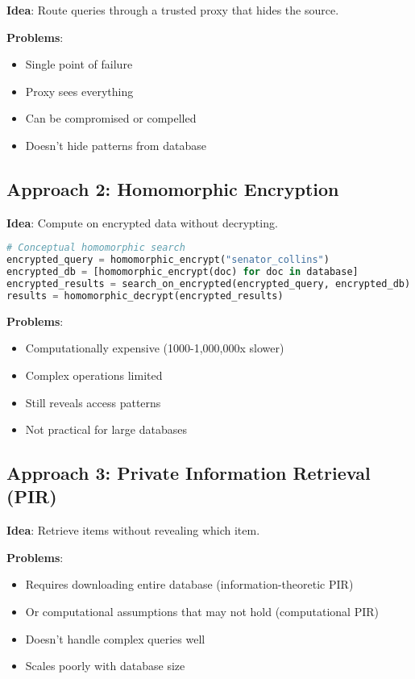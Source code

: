 \textbf{Idea}: Route queries through a trusted proxy that hides the source.

\textbf{Problems}:
\begin{itemize}
\item Single point of failure
\item Proxy sees everything
\item Can be compromised or compelled
\item Doesn't hide patterns from database
\end{itemize}

\subsection{Approach 2: Homomorphic Encryption}

\textbf{Idea}: Compute on encrypted data without decrypting.

\begin{lstlisting}[language=Python]
# Conceptual homomorphic search
encrypted_query = homomorphic_encrypt("senator_collins")
encrypted_db = [homomorphic_encrypt(doc) for doc in database]
encrypted_results = search_on_encrypted(encrypted_query, encrypted_db)
results = homomorphic_decrypt(encrypted_results)
\end{lstlisting}

\textbf{Problems}:
\begin{itemize}
\item Computationally expensive (1000-1,000,000x slower)
\item Complex operations limited
\item Still reveals access patterns
\item Not practical for large databases
\end{itemize}

\subsection{Approach 3: Private Information Retrieval (PIR)}

\textbf{Idea}: Retrieve items without revealing which item.

\textbf{Problems}:
\begin{itemize}
\item Requires downloading entire database (information-theoretic PIR)
\item Or computational assumptions that may not hold (computational PIR)
\item Doesn't handle complex queries well
\item Scales poorly with database size
\end{itemize}

